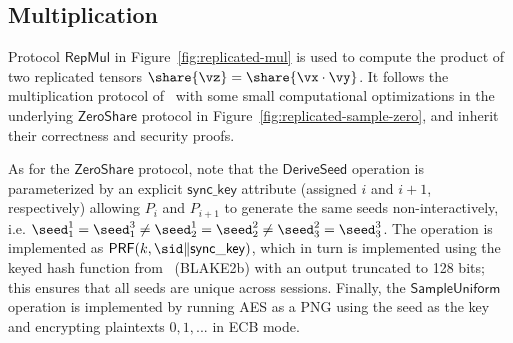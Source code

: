 \subsection{Multiplication}

Protocol $\mathsf{RepMul}$ in Figure~\ref{fig:replicated-mul} is used to compute the product of two replicated tensors $\share{\vz} = \share{\vx \cdot \vy}$. It follows the multiplication protocol of~\cite{CCS:AFLNO16} with some small computational optimizations in the underlying $\mathsf{ZeroShare}$ protocol in Figure~\ref{fig:replicated-sample-zero}, and inherit their correctness and security proofs.

As for the $\mathsf{ZeroShare}$ protocol, note that the $\mathsf{DeriveSeed}$ operation is parameterized by an explicit $\mathsf{sync\_key}$ attribute (assigned $i$ and $i+1$, respectively) allowing $P_i$ and $P_{i+1}$ to generate the same seeds non-interactively, i.e. $\seed^1_1 = \seed^3_1 \not = \seed^1_2 = \seed^2_2 \not = \seed^2_3 = \seed^3_3$. The operation is implemented as $\mathsf{PRF}(k, \sid \| \mathsf{sync\_key})$, which in turn is implemented using the keyed hash function from~\cite{libsodium} (BLAKE2b) with an output truncated to 128 bits; this ensures that all seeds are unique across sessions. Finally, the $\mathsf{SampleUniform}$ operation is implemented by running AES as a PNG using the seed as the key and encrypting plaintexts $0, 1, ...$ in ECB mode.

